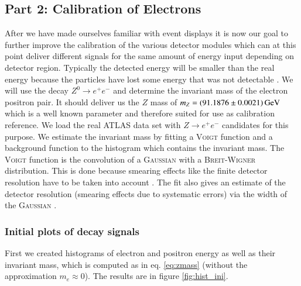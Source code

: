 \documentclass[11pt,a4paper,notitlepage]{scrartcl}
\begin{document}
\subsection{Part 2: Calibration of Electrons}
After we have made ourselves familiar with event displays it is now our goal to further improve the calibration of the various detector modules which can at this point deliver different signals for the same amount of energy input depending on detector region. Typically the detected energy will be smaller than the real energy because the particles have lost some energy that was not detectable \cite{manual}. We will use the decay $Z^0\to e^+e^-$ and determine the invariant mass of the electron positron pair. It should deliver us the $Z$ mass of $m_Z=\SI{91.1876\pm0.0021}{\giga\eV}$ \cite{pdg} which is a well known parameter and therefore suited for use as calibration reference. We load the real ATLAS data set with $Z\to e^+e^-$ candidates for this purpose. We estimate the invariant mass by fitting a \textsc{Voigt} function \cite{voigt} and a background function to the histogram which contains the invariant mass. The \textsc{Voigt} function is the convolution of a \textsc{Gaussian} with a \textsc{Breit-Wigner} distribution. This is done because smearing effects like the finite detector resolution have to be taken into account \cite{manual}. The fit also gives an estimate of the detector resolution (smearing effects due to systematic errors) via the width of the \textsc{Gaussian} \cite{manual}.
\subsubsection{Initial plots of decay signals}
First we created histograms of electron and positron energy as well as their invariant mass, which is computed as in eq. \eqref{eq:zmass} (without the approximation $m_e\approx 0$). The results are in figure \ref{fig:hist_ini}.
\end{document}

